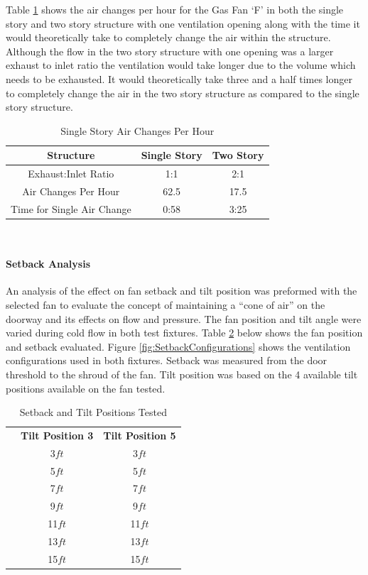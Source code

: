 \documentclass{article}
\begin{document}
Table \ref{table:airchanges} shows the air changes per hour for the Gas Fan `F' in both the single story and two story structure with one ventilation opening along with the time it would theoretically take to completely change the air within the structure. Although the flow in the two story structure with one opening was a larger exhaust to inlet ratio the ventilation would take longer due to the volume which needs to be exhausted. It would theoretically take three and a half times longer to completely change the air in the two story structure as compared to the single story structure. 

\begin{table}[H]
	\centering
	\caption{Single Story Air Changes Per Hour}
	\begin{tabular}{|c|c|c|}
		\hline
		Structure & Single Story & Two  Story \\ \hline \hline
		Exhaust:Inlet Ratio & 1:1 & 2:1 \\ \hline \hline
		Air Changes Per Hour & 62.5 & 17.5 \\ \hline
		Time for Single Air Change & 0:58 & 3:25  \\ \hline
	\end{tabular}
	\label{table:airchanges}
\end{table}\

\paragraph{Setback Analysis} \mbox{}

An analysis of the effect on fan setback and tilt position was preformed with the selected fan to evaluate the concept of maintaining a ``cone of air'' on the doorway and its effects on flow and pressure. The fan position and tilt angle were varied during cold flow in both test fixtures. Table \ref{table:SetbackPositions} below shows the fan position and setback evaluated. Figure \ref{fig:SetbackConfigurations} shows the ventilation configurations used in both fixtures. Setback was measured from the door threshold to the shroud of the fan. Tilt position was based on the 4 available tilt positions available on the fan tested. 

\begin{table}[H]
	\caption{Setback and Tilt Positions Tested}
	\centering
	\begin{tabular}{|c|c|c|}
		\hline
		& \textbf{Tilt Position 3} & \textbf{Tilt Position 5} \\ \cline{2-3} \cline{2-3}
		\parbox[t]{2mm}{} & 3$ft$ & 3$ft$ \\ \hline
		& 5$ft$ & 5$ft$ \\ 
		& 7$ft$ & 7$ft$ \\ 
		& 9$ft$ & 9$ft$ \\ 
		& 11$ft$ & 11$ft$ \\ 
		& 13$ft$ & 13$ft$ \\ 
		& 15$ft$ & 15$ft$ \\ \hline	
	\end{tabular}
	\label{table:SetbackPositions}
\end{table}
\end{document}
